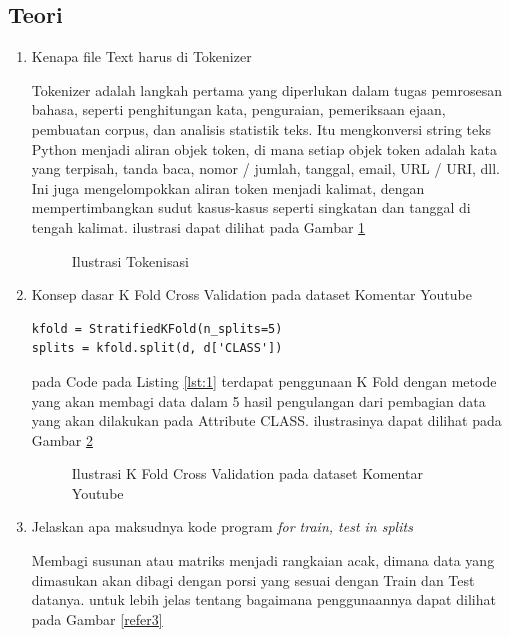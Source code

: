 \subsection{Teori}
\begin{enumerate}
\item Kenapa file Text harus di Tokenizer
\par Tokenizer adalah langkah pertama yang diperlukan dalam tugas pemrosesan bahasa, seperti penghitungan kata, penguraian, pemeriksaan ejaan, pembuatan corpus, dan analisis statistik teks. Itu mengkonversi string teks Python menjadi aliran objek token, di mana setiap objek token adalah kata yang terpisah, tanda baca, nomor / jumlah, tanggal, email, URL / URI, dll. Ini juga mengelompokkan aliran token menjadi kalimat, dengan mempertimbangkan sudut kasus-kasus seperti singkatan dan tanggal di tengah kalimat. ilustrasi dapat dilihat pada Gambar \ref{refer1}

\begin{figure}[!htbp]
      \caption{Ilustrasi Tokenisasi}
      \label{refer1}
\end{figure}

\item Konsep dasar K Fold Cross Validation pada dataset Komentar Youtube

\begin{lstlisting}[caption=K Fold Cross Validation,label={lst:1}]
kfold = StratifiedKFold(n_splits=5)
splits = kfold.split(d, d['CLASS'])
\end{lstlisting}

\par pada Code pada Listing \ref{lst:1} terdapat penggunaan K Fold dengan metode yang akan membagi data dalam 5 hasil pengulangan dari pembagian data yang akan dilakukan pada Attribute CLASS. ilustrasinya dapat dilihat pada Gambar \ref{refer2}

\begin{figure}[!htbp]
      \caption{Ilustrasi  K Fold Cross Validation pada dataset Komentar Youtube}
      \label{refer2}
\end{figure}

\item Jelaskan apa maksudnya kode program \emph{for train, test in splits}
\par Membagi susunan atau matriks menjadi rangkaian acak, dimana data yang dimasukan akan dibagi dengan porsi yang sesuai dengan Train dan Test datanya. untuk lebih jelas tentang bagaimana penggunaannya dapat dilihat pada Gambar \ref{refer3}


\end{enumerate}
